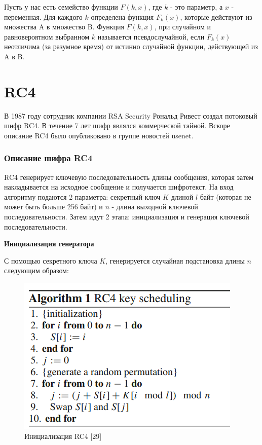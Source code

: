 \documentclass[colorthm]{./civarticle}
\begin{document}
\begin{definition}
    Пусть у нас есть семейство функции $F(k, x)$, где $k$ - это параметр, а $x$ - переменная. Для каждого $k$ определена функция $F_k(x)$, которые действуют из множества A в множество B. Функция $F(k, x)$, при случайном и равновероятном выбранном $k$ называется псевдослучайной, если $F_k(x)$ неотличима (за разумное время) от истинно случайной функции, действующей из A в B.
\end{definition}

\section{RC4}
В 1987 году сотрудник компании RSA Security Рональд Ривест создал потоковый шифр RC4. В течение 7 лет шифр являлся коммерческой тайной. Вскоре описание RC4 было опубликовано в группе новостей usenet.

\subsubsection{Описание шифра RC4}

RC4 генерирует ключевую последовательность длины сообщения, которая затем накладывается на исходное сообщение и получается шифротекст. На вход алгоритму подаются 2 параметра: секретный ключ $K$ длиной $l$ байт (которая не может быть больше 256 байт) и $n$ - длина выходной ключевой последовательности. Затем идут 2 этапа: инициализация и генерация ключевой последовательности.

\textbf{Инициализация генератора}

С помощью секретного ключа $K$, генерируется случайная подстановка длины $n$ следующим образом:

\begin{figure}[H]
    \centering
    \includegraphics[width=0.5\linewidth]{Снимок экрана 2024-01-12 162647.png}
    \caption{Инициализация RC4 [29]}
    \label{fig:enter-label}
\end{figure}
\end{document}
